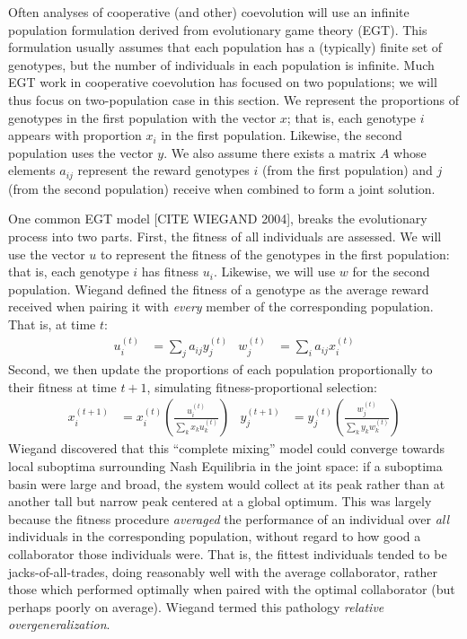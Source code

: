 \documentclass{acm_proc_article-sp}
\begin{document}
Often analyses of cooperative (and other) coevolution will use an infinite population formulation derived from evolutionary game theory (EGT).  This formulation usually assumes that each population has a (typically) finite set of genotypes, but the number of individuals in each population is infinite.  Much EGT work in cooperative coevolution has focused on two populations; we will thus focus on two-population case in this section.  We represent the proportions of genotypes in the first population with the vector \(x\); that is, each genotype \(i\) appears with proportion \(x_i\) in the first population.  Likewise, the second population uses the vector \(y\).  We also assume there exists a matrix \(A\) whose elements \(a_{ij}\) represent the reward genotypes \(i\) (from the first population) and \(j\) (from the second population) receive when combined to form a joint solution.

One common EGT model [CITE WIEGAND 2004], breaks the evolutionary process into two parts.  First, the fitness of all individuals are assessed. We will use the vector \(u\) to represent the fitness of the genotypes in the first population: that is, each genotype \(i\) has fitness \(u_i\).  Likewise, we will use \(w\) for the second population.  Wiegand defined the fitness of a genotype as the average reward received when pairing it with {\it every} member of the corresponding population.  That is, at time \(t\):
%
\begin{align}
\label{egtfitness}
u_i^{(t)} &= \sum_j a_{ij} y_j^{(t)} &
w_j^{(t)} &= \sum_i a_{ij} x_i^{(t)}
\end{align}
%
Second, we then update the proportions of each population proportionally to their fitness at time \(t+1\), simulating fitness-proportional selection:
%
\begin{align}
\label{eqtupdate}
x_i^{(t+1)} &= x_i^{(t)} \left( \frac{u_i^{(t)}}{\sum_k x_k u_k^{(t)}} \right) &
y_j^{(t+1)} &= y_j^{(t)} \left( \frac{w_j^{(t)}}{\sum_k y_k w_k^{(t)}} \right)
\end{align}
%
Wiegand discovered that this ``complete mixing'' model could converge towards local suboptima surrounding Nash Equilibria in the joint space: if a suboptima basin were large and broad, the system would collect at its peak rather than at another tall but narrow peak centered at a global optimum.  This was largely because the fitness procedure {\it averaged} the performance of an individual over {\it all} individuals in the corresponding population, without regard to how good a collaborator those individuals were.  That is, the fittest individuals tended to be jacks-of-all-trades, doing reasonably well with the average collaborator, rather those which performed optimally when paired with the optimal collaborator (but perhaps poorly on average).  Wiegand termed this pathology {\it relative overgeneralization}.
\end{document}
